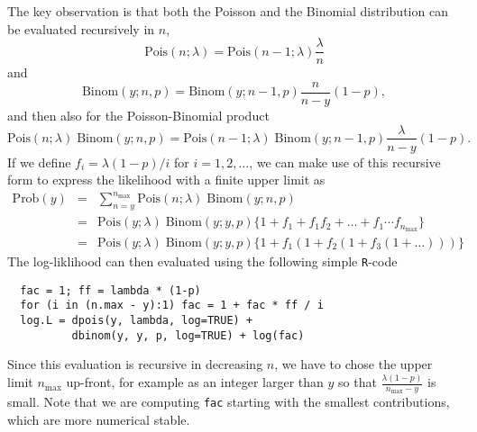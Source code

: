 \documentclass[a4paper,11pt]{article}
\begin{document}
The key observation is that both the Poisson and the Binomial
distribution can be evaluated recursively in $n$,
\begin{displaymath}
    \text{Pois}(n; \lambda) = \text{Pois}(n-1; \lambda) \frac{\lambda}{n}
\end{displaymath}
and
\begin{displaymath}
    \text{Binom}(y; n, p) = \text{Binom}(y; n-1, p) \frac{n}{n-y}(1-p),
\end{displaymath}
and then also for the Poisson-Binomial product
\begin{displaymath}
    \text{Pois}(n ; \lambda) \; \text{Binom}(y;  n, p)
    =
    \text{Pois}(n-1; \lambda) \; \text{Binom}(y; n-1, p)
    \frac{\lambda}{n-y}(1-p).
\end{displaymath}
If we define $f_i = \lambda(1-p)/i$ for $i=1, 2, \ldots$, we can make
use of this recursive form to express the likelihood with a finite
upper limit as
\begin{eqnarray}
    \text{Prob}(y) &=& \sum_{n = y}^{n_{\text{max}}}
                       \text{Pois}(n ; \lambda)\;
                      \text{Binom}(y;  n, p) \nonumber\\
                   &=& \text{Pois}(y; \lambda)\; \text{Binom}(y; y, p)
                       \Big\{ 1 + f_1 + f_1f_2 + 
                    \ldots
                      +f_1\cdots f_{n_\text{max}}
                       \Big\} \nonumber\\
                   &=& \text{Pois}(y; \lambda)\; \text{Binom}(y; y, p)
                       \Big\{ 1 + f_1(1+f_2(1+f_3(1+ \dots)))\Big\}\nonumber
\end{eqnarray}
The log-liklihood can then evaluated using the following simple
\texttt{R}-code
\begin{verbatim}
  fac = 1; ff = lambda * (1-p)
  for (i in (n.max - y):1) fac = 1 + fac * ff / i
  log.L = dpois(y, lambda, log=TRUE) +
          dbinom(y, y, p, log=TRUE) + log(fac)
\end{verbatim}
Since this evaluation is recursive in decreasing $n$, we have to chose
the upper limit $n_\text{max}$ up-front, for example as an integer
larger than $y$ so that $\frac{\lambda (1-p)}{n_\text{max}-y}$ is
small. Note that we are computing \texttt{fac} starting with the
smallest contributions, which are more numerical stable.
\end{document}
